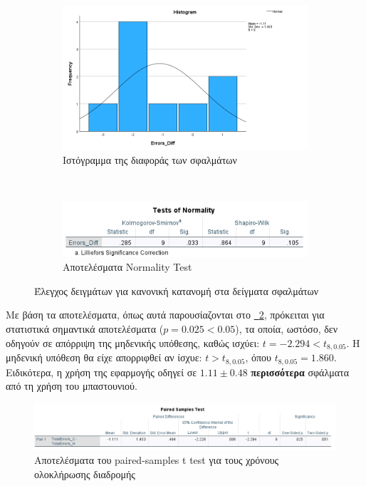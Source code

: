 \begin{figure}[!hb]
    \centering
    \begin{subfigure}{0.8\textwidth}
        \centering
        \includegraphics[width=1\linewidth]{./images/SA_Histogram_TotalErrorsDiff.png}
        \caption{Ιστόγραμμα της διαφοράς των σφαλμάτων}
    \end{subfigure}%
    \\
    \begin{subfigure}{0.8\textwidth}
        \centering
        \includegraphics[width=1\linewidth]{images/SA_NormalityTest_TotalErrorsDiff.png}
        \caption{Αποτελέσματα Normality Test}
    \end{subfigure}%
    \caption{Έλεγχος δειγμάτων για κανονική κατανομή στα δείγματα σφαλμάτων}\label{fig:SANormalDistributionTE}
\end{figure}

Με βάση τα αποτελέσματα, όπως αυτά παρουσίαζονται στο \hyperref[fig:SATTestTEDiff]{\schema~\ref*{fig:SATTestTEDiff}}, πρόκειται για στατιστικά σημαντικά αποτελέσματα ($p = 0.025 < 0.05$), τα οποία, ωστόσο, δεν οδηγούν σε απόρριψη της μηδενικής υπόθεσης, καθώς ισχύει: $t = -2.294 < t_{8,0.05}$. Η μηδενική υπόθεση θα είχε απορριφθεί αν ίσχυε: $t > t_{8,0.05}$, όπου $t_{8,0.05} = 1.860$. Ειδικότερα, η χρήση της εφαρμογής οδηγεί σε $1.11 \pm 0.48$ \textbf{περισσότερα} σφάλματα από τη χρήση του μπαστουνιού.

\begin{figure}[!h]
    \centering
    \includegraphics[width=1\linewidth]{./images/SA_TTestResult_TotalErrorsDiff.png}
    \caption{Αποτελέσματα του paired-samples t test για τους χρόνους ολοκλήρωσης διαδρομής}\label{fig:SATTestTEDiff}
\end{figure}

